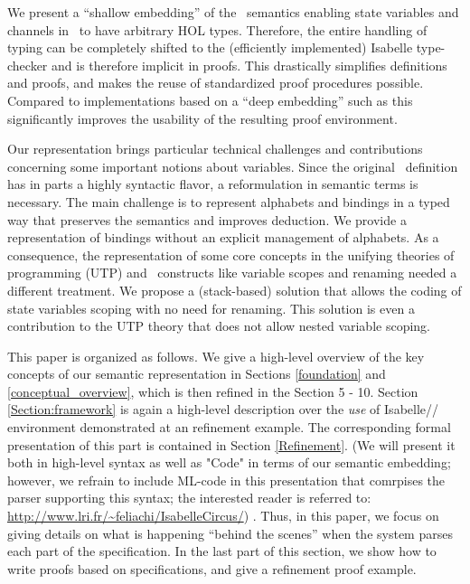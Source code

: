 \documentclass[11pt,a4paper]{article}
\begin{document}
We present a ``shallow embedding'' of the \Circus\
semantics enabling state variables and channels in \Circus\ to have
arbitrary HOL types. Therefore, the entire handling of typing can be
completely shifted to the (efficiently implemented) Isabelle
type-checker and is therefore implicit in proofs. This drastically
simplifies definitions and proofs, and makes the reuse of
standardized proof procedures possible. Compared to implementations
based on a ``deep embedding'' such as \cite{ZC09} this significantly improves the
usability of the resulting proof environment.

Our representation brings particular technical challenges and contributions concerning
some important notions about variables. Since the original \Circus\ definition
has in parts a highly syntactic flavor, a reformulation in semantic terms is
necessary. The main challenge is to represent alphabets 
and bindings in a typed way that preserves the semantics and improves deduction. 
We provide  a representation of bindings without an explicit management of alphabets. 
As a consequence, the  representation of some core concepts in the unifying theories of programming 
(UTP) and \Circus\ constructs like variable scopes and renaming needed a different treatment. 
We propose a (stack-based) solution that allows the coding of state variables 
scoping with no need for renaming. This solution is even a contribution to the UTP theory that 
does not allow nested variable scoping. 

This paper is organized as follows. We give a high-level overview of the 
key concepts of our semantic representation in Sections \ref{foundation} and
\ref{conceptual_overview}, which is then refined in the Section 5 - 10. Section \ref{Section:framework}
is again a high-level description over the \emph{use} of Isabelle/\Circus/ environment
demonstrated at an refinement example. The corresponding
formal presentation of this part is contained in Section \ref{Refinement}. 
(We will present it both in high-level syntax as well as "Code" in terms of our semantic embedding; 
however, we refrain to include ML-code in this presentation that comrpises the parser supporting this
syntax; the interested reader is referred to: \url{http://www.lri.fr/~feliachi/IsabelleCircus/}) . 
Thus, in this paper, we focus on giving details on what
is happening ``behind the scenes'' when the system parses each part of the specification. In the last part of 
this section, we show how to write proofs based on specifications, and give a refinement proof example.
\end{document}

